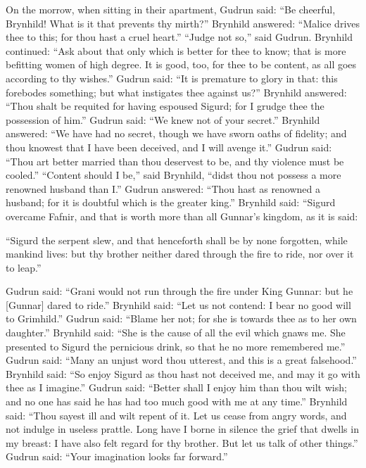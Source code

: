 On the morrow, when sitting in their apartment, Gudrun said: ``Be
cheerful, Brynhild! What is it that prevents thy mirth?'' Brynhild
answered: ``Malice drives thee to this; for thou hast a cruel heart.''
``Judge not so,'' said Gudrun. Brynhild continued: ``Ask about that only
which is better for thee to know; that is more befitting women of high
degree. It is good, too, for thee to be content, as all goes according
to thy wishes.'' Gudrun said: ``It is premature to glory in that: this
forebodes something; but what instigates thee against us?'' Brynhild
answered: ``Thou shalt be requited for having espoused Sigurd; for I
grudge thee the possession of him.'' Gudrun said: ``We knew not of your
secret.'' Brynhild answered: ``We have had no secret, though we have
sworn oaths of fidelity; and thou knowest that I have been deceived,
and I will avenge it.'' Gudrun said: ``Thou art better married than thou
deservest to be, and thy violence must be cooled.'' ``Content should I
be,'' said Brynhild, ``didst thou not possess a more renowned husband
than I.'' Gudrun answered: ``Thou hast as renowned a husband; for it is
doubtful which is the greater king.'' Brynhild said: ``Sigurd overcame
Fafnir, and that is worth more than all Gunnar's kingdom, as it is
said:

``Sigurd the serpent slew, and that henceforth shall be by none
forgotten, while mankind lives: but thy brother neither dared through
the fire to ride, nor over it to leap.''

Gudrun said: ``Grani would not run through the fire under King Gunnar:
but he [Gunnar] dared to ride.'' Brynhild said: ``Let us not contend: I
bear no good will to Grimhild.'' Gudrun said: ``Blame her not; for she
is towards thee as to her own daughter.'' Brynhild said: ``She is the
cause of all the evil which gnaws me. She presented to Sigurd the
pernicious drink, so that he no more remembered me.'' Gudrun said:
``Many an unjust word thou utterest, and this is a great falsehood.''
Brynhild said: ``So enjoy Sigurd as thou hast not deceived me, and may
it go with thee as I imagine.'' Gudrun said: ``Better shall I enjoy him
than thou wilt wish; and no one has said he has had too much good with
me at any time.'' Brynhild said: ``Thou sayest ill and wilt repent of
it. Let us cease from angry words, and not indulge in useless prattle.
Long have I borne in silence the grief that dwells in my breast: I
have also felt regard for thy brother. But let us talk of other
things.'' Gudrun said: ``Your imagination looks far forward.''

